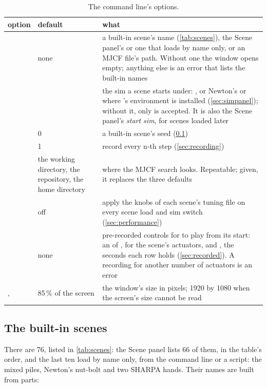 \begin{table}[t]
\centering
\caption{The command line's options.}
\label{tab:cli}
\small
\begin{tabularx}{\linewidth}{@{}L{25mm}L{30mm}Y@{}}
\toprule
option & default & what \\
\midrule
{} & none & a built-in scene's name (\cref{tab:scenes}), the Scene panel's or one that loads by name only, or an MJCF file's path. Without one the window opens empty; anything else is an error that lists the built-in names \\
 &  & the sim a scene starts under: , or Newton's  or  where 's environment is installed (\cref{sec:simpanel}); without it, only  is accepted. It is also the Scene panel's \emph{start sim}, for scenes loaded later \\
 & 0 & a built-in scene's seed (\cref{sec:builtin}) \\
 & 1 & record every n-th step (\cref{sec:recording}) \\
 & the working directory, the repository, the home directory & where the MJCF search looks. Repeatable; given, it replaces the three defaults \\
 & off & apply the knobs of each scene's tuning file on every scene load and sim switch (\cref{sec:performance}) \\
 & none & pre-recorded controls for  to play from its start: an  of ,  for the scene's actuators, and , the seconds each row holds (\cref{sec:recorded}). A recording for another number of actuators is an error \\
,  & 85\,\% of the screen & the window's size in pixels; 1920 by 1080 when the screen's size cannot be read \\
\bottomrule
\end{tabularx}
\end{table}

\subsection{The built-in scenes}\label{sec:builtin}

There are 76, listed in \cref{tab:scenes}: the Scene panel lists 66 of them, in the table's order, and the last ten load by name only, from the command line or a script: the mixed piles, Newton's nut-bolt and two SHARPA hands. Their names are built from parts:

